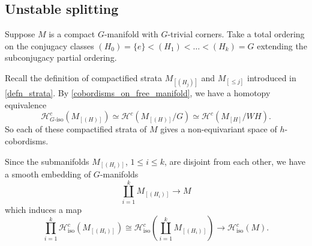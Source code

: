 \documentclass[11pt]{amsart}
\theoremstyle{definition}
\numberwithin{equation}{section}
\numberwithin{figure}{section}
\newcommand{\ra}{\longrightarrow}
\newcommand{\mc}{\mathcal}
\newcommand{\Hiso}{\mathcal{H}_{\iso}}
\newcommand{\iso}{\mathrm{iso}}
\newcommand{\dashiso}{\textrm{-}\mathrm{iso}}
\begin{document}
\subsection{Unstable splitting}\label{unstablesplitting}

Suppose $M$ is a compact $G$-manifold with $G$-trivial corners. Take a total ordering on the conjugacy classes $(H_0) = \{e\} < (H_1) < \ldots < (H_k) = G$ extending the subconjugacy partial ordering.

Recall the definition of compactified strata $M_{[(H_j)]}$ and $M_{[\leq j]}$ introduced in \autoref{defn_strata}. By \autoref{cobordisms_on_free_manifold}, we have a homotopy equivalence
\[ \mc H_{G\dashiso}^c(M_{[(H)]}) \simeq \mc H^c(M_{[(H)]}/G) \simeq \mc H^c(M_{[H]}/WH). \]
So each of these compactified strata of $M$ gives a non-equivariant space of $h$-cobordisms.

Since the submanifolds $M_{[(H_i)]}$, $1 \leq i \leq k$, are disjoint from each other, we have a smooth embedding of $G$-manifolds
\begin{equation*}\label{embed_the_strata}
\coprod_{i=1}^k M_{[(H_i)]} \ra M
\end{equation*}
which induces a map
\begin{equation}\label{left_splitting}
	\prod_{i=1}^k \Hiso^c(M_{[(H_i)]}) \cong \Hiso^c\left( \coprod_{i=1}^k M_{[(H_i)]}\right)  \ra \Hiso^c(M).
\end{equation}
%
\end{document}
